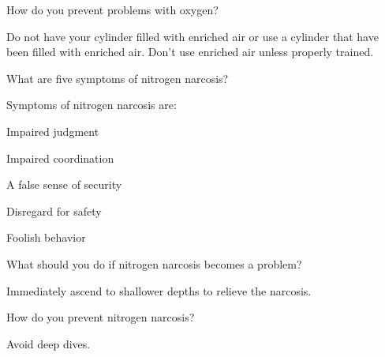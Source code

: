 	\begin{qanda}
		\begin{question}
How do you prevent problems with oxygen?
		\end{question}

		\begin{answer}
Do not have your cylinder filled with enriched air or use a cylinder that have been filled with enriched air.  Don't use enriched air unless properly trained.
		\end{answer}
	\end{qanda}

	\begin{qanda}
		\begin{question}
What are five symptoms of nitrogen narcosis?
		\end{question}

		\begin{answer}
Symptoms of nitrogen narcosis are:
			\begin{nospacenumberedlist}
				\item Impaired judgment
				\item Impaired coordination
				\item A false sense of security
				\item Disregard for safety
				\item Foolish behavior
			\end{nospacenumberedlist}
		\end{answer}
	\end{qanda}

	\begin{qanda}
		\begin{question}
What should you do if nitrogen narcosis becomes a problem?
		\end{question}

		\begin{answer}
Immediately ascend to shallower depths  to relieve the narcosis.
		\end{answer}
	\end{qanda}

	\begin{qanda}
		\begin{question}
How do you prevent nitrogen narcosis?
		\end{question}

		\begin{answer}
Avoid deep dives.
		\end{answer}
	\end{qanda}

